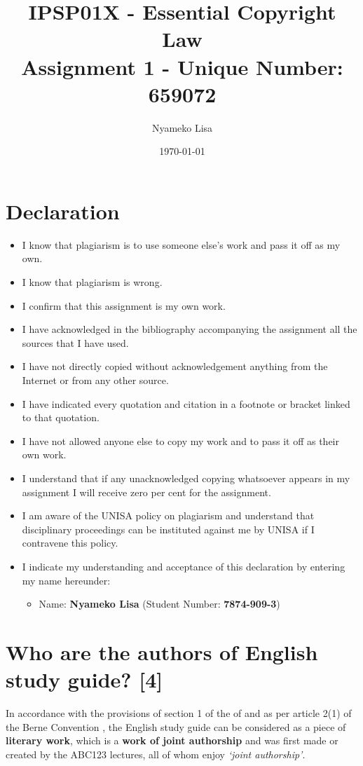 \documentclass[11pt]{article}
\author{Nyameko Lisa}
\date{\today}
\title{IPSP01X - Essential Copyright Law\\\medskip
\large Assignment 1 - Unique Number: 659072}
\begin{document}
\maketitle
\section*{Declaration}
\label{sec:org534d01f}
\begin{itemize}
\item I know that plagiarism is to use someone else’s work and pass it off as my own.
\item I know that plagiarism is wrong.
\item I confirm that this assignment is my own work.
\item I have acknowledged in the bibliography accompanying the assignment all the sources that I have used.
\item I have not directly copied without acknowledgement anything from the Internet or from any other source.
\item I have indicated every quotation and citation in a footnote or bracket linked to that quotation.
\item I have not allowed anyone else to copy my work and to pass it off as their own work.
\item I understand that if any unacknowledged copying whatsoever appears in my assignment I will receive zero per cent for the assignment.
\item I am aware of the UNISA policy on plagiarism and understand that disciplinary proceedings can be instituted against me by UNISA if I contravene this policy.
\item I indicate my understanding and acceptance of this declaration by
entering my name hereunder:
\begin{itemize}
\item Name: \textbf{Nyameko Lisa} (Student Number: \textbf{7874-909-3})
\end{itemize}
\end{itemize}
\newpage
\section{Who are the authors of English study guide? \textbf{[4]}}
\label{sec:org0f8e1c7}

In accordance with the provisions of section 1 of the
 of 
\cite{rsa78_copyrightact} and as per article 2(1) of the Berne
Convention \cite{wipo86_berne}, the English study guide can be
considered as a piece of \textbf{literary work}, which is a \textbf{work of joint
authorship} and was first made or created by the ABC123 lectures, all
of whom enjoy \emph{`joint authorship'}.\\
\end{document}
